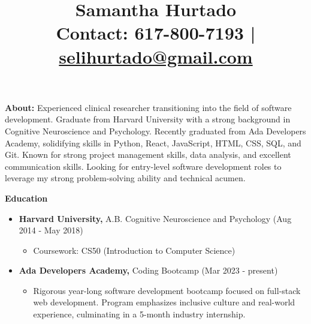 \documentclass[a4paper,10pt]{article}
\title{\vspace{-3cm}Samantha Hurtado \\ \vspace{3mm} \normalsize \textbf{Contact:} 617-800-7193 | \href{mailto:selihurtado@gmail.com}{selihurtado@gmail.com}}
\date{\vspace{-5ex}}  %
\begin{document}
\maketitle


\noindent
\textbf{About:} Experienced clinical researcher transitioning into the field of software development. Graduate from Harvard University with a strong background in Cognitive Neuroscience and Psychology. Recently graduated from Ada Developers Academy, solidifying skills in Python, React, JavaScript, HTML, CSS, SQL, and Git. Known for strong project management skills, data analysis, and excellent communication skills. Looking for entry-level software development roles to leverage my strong problem-solving ability and technical acumen.\\

\vspace{8pt}

\noindent
\textbf{Education}
\begin{itemize}[noitemsep,topsep=0pt,parsep=0pt,partopsep=0pt,itemsep=2pt,after=\vspace{\baselineskip}]
\item \textbf{Harvard University,} A.B. Cognitive Neuroscience and Psychology (Aug 2014 - May 2018)
\begin{itemize}[noitemsep,topsep=0pt,parsep=0pt,partopsep=0pt,itemsep=2pt]
\item Coursework: CS50 (Introduction to Computer Science)
\end{itemize}
\item \textbf{Ada Developers Academy,} Coding Bootcamp (Mar 2023 - present)
    
\begin{itemize}[noitemsep,topsep=0pt,parsep=0pt,partopsep=0pt,itemsep=2pt]
\item Rigorous year-long software development bootcamp focused on full-stack web development. Program emphasizes inclusive culture and real-world experience, culminating in a 5-month industry internship.
\end{itemize}


\end{itemize}

\vspace{8pt}
\end{document}
